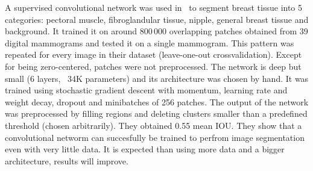 \begin{comment}
- uses sliding convnets/trained end-to-end/ fully convolutional networks
- Faster computation because of end-to-end
- Tissue segmentation (not lesion segmentation): pectoral muscle, fibroglandular tissue, nipple, and general breast tissue and background.
- data set 40(!) digital(!) mammograms
- no enhancement
- small 61x61 input images
- global zero-mean (substract the mean of all intensity values) (not so necessary). 
- cross-entropy loss
- by overlapping, they get 8x10^5 training patches
- overlapping pooling
- they do not use zero-padding,
- 829 x 640 original image dimensions
- train on 39 images, test on 1 LOOCV
- shift-and-stitch method (no upsampling)
- post-processing: regions are filled, and clusters less than a threshold are deleted (threshold is set arbitrarily)
- SGD with momentum
- mini-batches of 256 image patches, learning rate = 0.001, learning rate was reduced by a factor of 10 after 10 and 20 epochs, momentum 0.9, weight decay 0.0005
Dropout removed during testing.
- trained with patches, tested with fully convnet
\end{comment}
A supervised convolutional network was used in~\cite{Dubrovina2015} to segment breast tissue into 5 categories: pectoral muscle, fibroglandular tissue, nipple, general breast tissue and background. It trained it on around 800\,000 overlapping patches obtained from 39 digital mammograms and tested it on a single mammogram. This pattern was repeated for every image in their dataset (leave-one-out crossvalidation). Except for being zero-centered, patches were not preprocessed. The network is deep but small (6 layers, ~34K parameters) and its architecture was chosen by hand. It was trained using stochastic gradient descent with momentum, learning rate and weight decay, dropout and minibatches of 256 patches. The output of the network was preprocessed by filling regions and deleting clusters smaller than a predefined threshold (chosen arbitrarily). They obtained 0.55 mean IOU. They show that a convolutional networm can succesfully be trained to perfrom image segmentation even with very little data. It is expected than using more data and a bigger architecture, results will improve.

